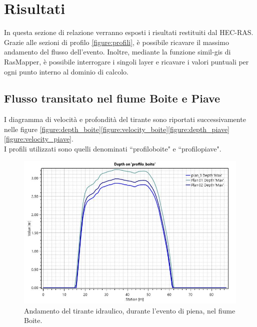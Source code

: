 \section{Risultati}
In questa sezione di relazione verranno esposti i risultati restituiti dal HEC-RAS.\\
Grazie alle sezioni di profilo \eqref{figure:profili}, è possibile ricavare il massimo andamento del flusso dell'evento. Inoltre, mediante la funzione simil-gis di RasMapper, è possibile interrogare i singoli layer e ricavare i valori puntuali per ogni punto interno al dominio di calcolo.

\subsection{Flusso transitato nel fiume Boite e Piave}
I diagramma di velocità e profondità del tirante sono riportati successivamente nelle figure \eqref{figure:depth_boite}\eqref{figure:velocity_boite}\eqref{figure:depth_piave}\eqref{figure:velocity_piave}.\\
I profili utilizzati sono quelli denominati ``profilo\textunderscore boite" e ``profilo\textunderscore piave".

\begin{figure}[H] \centering
    \includegraphics[scale=0.5]{immagini/depth_boite.JPG}
    \caption{Andamento del tirante idraulico, durante l'evento di piena, nel fiume Boite.}
    \label{figure:depth_boite}
\end{figure}

